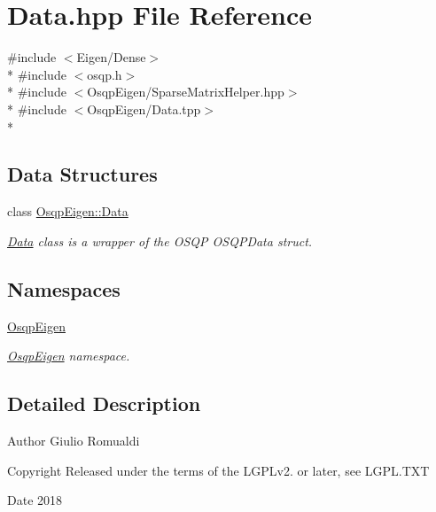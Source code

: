 \section{Data.\+hpp File Reference}
\label{Data_8hpp}
{\ttfamily \#include $<$Eigen/\+Dense$>$}\\*
{\ttfamily \#include $<$osqp.\+h$>$}\\*
{\ttfamily \#include $<$Osqp\+Eigen/\+Sparse\+Matrix\+Helper.\+hpp$>$}\\*
{\ttfamily \#include $<$Osqp\+Eigen/\+Data.\+tpp$>$}\\*
\subsection*{Data Structures}
\begin{DoxyCompactItemize}
\item 
class \hyperlink{classOsqpEigen_1_1Data}{Osqp\+Eigen\+::\+Data}
\begin{DoxyCompactList}\small\item\em \hyperlink{classOsqpEigen_1_1Data}{Data} class is a wrapper of the O\+S\+QP O\+S\+Q\+P\+Data struct. \end{DoxyCompactList}\end{DoxyCompactItemize}
\subsection*{Namespaces}
\begin{DoxyCompactItemize}
\item 
 \hyperlink{namespaceOsqpEigen}{Osqp\+Eigen}
\begin{DoxyCompactList}\small\item\em \hyperlink{namespaceOsqpEigen}{Osqp\+Eigen} namespace. \end{DoxyCompactList}\end{DoxyCompactItemize}


\subsection{Detailed Description}
\begin{DoxyAuthor}{Author}
Giulio Romualdi 
\end{DoxyAuthor}
\begin{DoxyCopyright}{Copyright}
Released under the terms of the L\+G\+P\+Lv2. or later, see L\+G\+P\+L.\+T\+XT 
\end{DoxyCopyright}
\begin{DoxyDate}{Date}
2018 
\end{DoxyDate}
